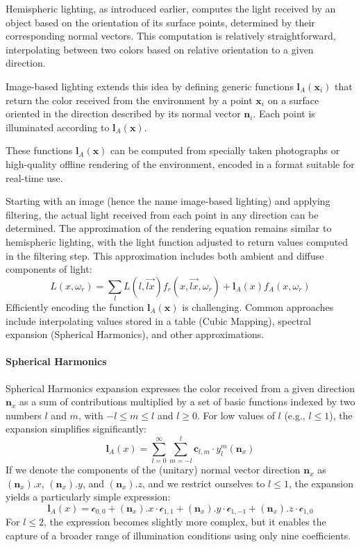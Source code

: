 Hemispheric lighting, as introduced earlier, computes the light received by an object based on the orientation of its surface points, determined by their corresponding normal vectors. 
This computation is relatively straightforward, interpolating between two colors based on relative orientation to a given direction.

Image-based lighting extends this idea by defining generic functions $\mathbf{l}_A(\mathbf{x}_i)$ that return the color received from the environment by a point $\mathbf{x}_i$ on a surface oriented in the direction described by its normal vector $\mathbf{n}_i$. 
Each point is illuminated according to $\mathbf{l}_A(\mathbf{x})$.

These functions $\mathbf{l}_A(\mathbf{x})$ can be computed from specially taken photographs or high-quality offline rendering of the environment, encoded in a format suitable for real-time use.

Starting with an image (hence the name image-based lighting) and applying filtering, the actual light received from each point in any direction can be determined. 
The approximation of the rendering equation remains similar to hemispheric lighting, with the light function adjusted to return values computed in the filtering step.
This approximation includes both ambient and diffuse components of light:
\[L(x,\omega_r)=\sum_lL(l,\overrightarrow{lx})f_r(x,\overrightarrow{lx},\omega_r)+\mathbf{l}_A(x)f_A(x,\omega_r)\]
Efficiently encoding the function $\mathbf{l}_A(\mathbf{x})$ is challenging. 
Common approaches include interpolating values stored in a table (Cubic Mapping), spectral expansion (Spherical Harmonics), and other approximations.

\paragraph*{Spherical Harmonics}
Spherical Harmonics expansion expresses the color received from a given direction $\mathbf{n}_x$ as a sum of contributions multiplied by a set of basic functions indexed by two numbers $l$ and $m$, with $-l\leq m \leq l$ and $l\geq 0$. 
For low values of $l$ (e.g., $l\leq 1$), the expansion simplifies significantly:
\[\mathbf{l}_A(x)=\sum_{l=0}^{\infty}\sum_{m=-l}^l\mathbf{c}_{l,m}\cdot y_l^m(\mathbf{n}_x)\]
If we denote the components of the (unitary) normal vector direction $\mathbf{n}_x$ as $(\mathbf{n}_x).x$, $(\mathbf{n}_x).y$, and $(\mathbf{n}_x).z$, and we restrict ourselves to $l \leq 1$, the expansion yields a particularly simple expression:
\[\mathbf{l}_A(x) = \mathcal{c}_{0,0} + (\mathbf{n}_x). x \cdot \mathcal{c}_{1,1} + (\mathbf{n}_x). y \cdot \mathcal{c}_{1,-1} + (\mathbf{n}_x). z \cdot \mathcal{c}_{1,0}\]
For $l \leq 2$, the expression becomes slightly more complex, but it enables the capture of a broader range of illumination conditions using only nine coefficients.